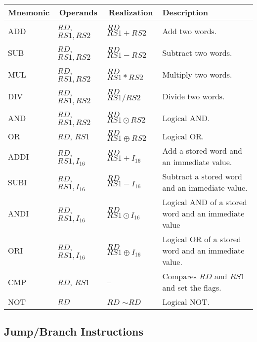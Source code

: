 \documentclass{article}
\begin{document}
 \FloatBarrier
  \begin{table}[H]
    \begin{center}
      \begin{tabular}[pos]{| l | l | l | m{5cm} |} \hline 	
      \multicolumn{1}{|c|}{\cellcolor[gray]{0.9}\textbf{Mnemonic}} &
      \multicolumn{1}{c|}{\cellcolor[gray]{0.9}\textbf{Operands}} &
      \multicolumn{1}{c|}{\cellcolor[gray]{0.9}\textbf{Realization}} &
      \multicolumn{1}{m{5cm}|}{\cellcolor[gray]{0.9}\textbf{Description}} \\ \hline
	ADD  	& $RD$, $RS1, RS2$ 	& $RD$ \textleftarrow $RS1 + RS2$ 	& Add two words. 			\\ \hline
	SUB 	& $RD$, $RS1, RS2$ 	& $RD$ \textleftarrow $RS1 - RS2$ 	& Subtract two words. 		\\ \hline
	MUL 	& $RD$, $RS1, RS2$ 	& $RD$ \textleftarrow $RS1 * RS2$ 	& Multiply two words.		\\ \hline
	DIV   	& $RD$, $RS1, RS2$ 	& $RD$ \textleftarrow $RS1 / RS2$ 	& Divide two words.		\\ \hline
	AND  	& $RD$, $RS1, RS2$ 	& $RD$ \textleftarrow $RS1 \odot RS2$ 	& Logical AND.		\\ \hline
	OR 	    & $RD$, $RS1$ 	    & $RD$ \textleftarrow $RS1 \oplus RS2$ 	& Logical OR.	\\ \hline
	ADDI  	& $RD$, $RS1, I_{16}$ 	& $RD$ \textleftarrow $RS1 + I_{16}$ 	& Add a stored word and an \mbox{immediate} value. \\ \hline
	SUBI 	& $RD$, $RS1, I_{16}$ 	& $RD$ \textleftarrow $RS1 - I_{16}$ 	& Subtract a stored word and an immediate value.\\ \hline
	ANDI 	& $RD$, $RS1, I_{16}$ 	& $RD$ \textleftarrow $RS1 \odot I_{16}$ 	& Logical AND of a stored word and an immediate value		\\ \hline
	ORI   	& $RD$, $RS1, I_{16}$ 	& $RD$ \textleftarrow $RS1 \oplus I_{16}$ 	& Logical OR of a stored word and an immediate value.		\\ \hline	
	CMP 	& $RD$, $RS1$ 	    & -- 					            & Compares $RD$ and $RS1$ and set the flags.\\ \hline
	NOT 	& $RD$ 	            & $RD$ \textleftarrow $\sim RD$     & Logical NOT.	\\ \hline
      \end{tabular}
    \end{center}
  \end{table} 
  
  \subsection{Jump/Branch Instructions}
\end{document}
